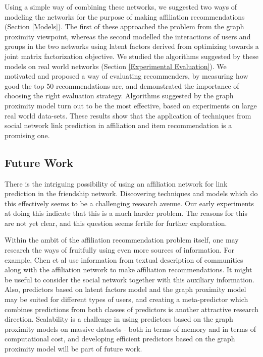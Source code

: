 \documentclass{sig-alternate}
\begin{document}
Using a simple way of combining these networks, we suggested two ways of modeling the networks for the purpose of making affiliation recommendations (Section \ref{Models}). The first of these approached the problem from the graph proximity viewpoint, whereas the second modelled the interactions of users and groups in the two networks using latent factors derived from optimizing towards a joint matrix factorization objective. We studied the algorithms suggested by these models on real world networks (Section \ref{Experimental Evaluation}). We motivated and proposed a way of evaluating recommenders, by measuring how good the top 50 recommendations are, and demonstrated the importance of choosing the right evaluation strategy. Algorithms suggested by the graph proximity model turn out to be the most effective, based on experiments on large real world data-sets. These results show that the application of techniques from social network link prediction in affiliation and item recommendation is a promising one.

\subsection{Future Work}
There is the intriguing possibility of using an affiliation network for link prediction in the friendship network. Discovering techniques and models which do this effectively seems to be a challenging research avenue. Our early experiments at doing this indicate that this is a much harder problem. The reasons for this are not yet clear, and this question seems fertile for further exploration.

Within the ambit of the affiliation recommendation problem itself, one may research the ways of fruitfully using even more sources of information. For example, Chen et al\cite{GoogleCCF} use information from textual description of communities along with the affiliation network to make affiliation recommendations. It might be useful to consider the social network together with this auxiliary information. Also, predictors based on latent factors model and the graph proximity model may be suited for different types of users, and creating a meta-predictor which combines predictions from both classes of predictors is another attractive research direction. Scalability is a challenge in using predictors based on the graph proximity models on massive datasets - both in terms of memory and in terms of computational cost\cite{savas10c}, and developing efficient predictors based on the graph proximity model will be part of future work.
\end{document}
